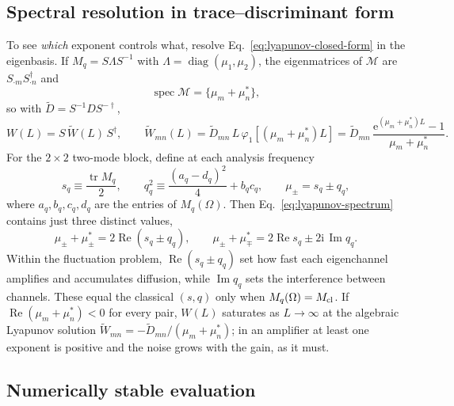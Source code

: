\documentclass[11pt,a4paper]{article}
\newcommand{\ii}{\mathrm i}
\newcommand{\e}{\mathrm e}
\newcommand{\Rea}{\operatorname{Re}}
\newcommand{\Ima}{\operatorname{Im}}
\begin{document}
\subsection{Spectral resolution in trace--discriminant form}

To see \emph{which} exponent controls what, resolve
Eq.~\eqref{eq:lyapunov-closed-form} in the eigenbasis. If
$M_q=S\Lambda S^{-1}$ with $\Lambda=\operatorname{diag}(\mu_1,\mu_2)$, the
eigenmatrices of $\mathcal M$ are $S_{\cdot m}S_{\cdot n}^\dagger$ and
\begin{equation}
\operatorname{spec}\mathcal M=\{\mu_m+\mu_n^*\},
\label{eq:lyapunov-spectrum}
\end{equation}
so with $\widetilde D=S^{-1}DS^{-\dagger}$,
\begin{equation}
W(L)=S\,\widetilde W(L)\,S^\dagger,\qquad
\widetilde W_{mn}(L)=\widetilde D_{mn}\,
L\,\varphi_1\!\left[(\mu_m+\mu_n^*)L\right]
=\widetilde D_{mn}\,\frac{\e^{(\mu_m+\mu_n^*)L}-1}{\mu_m+\mu_n^*} .
\label{eq:lyapunov-eigenbasis}
\end{equation}
For the $2\times2$ two-mode block, define at each analysis frequency
\begin{equation}
s_q\equiv\frac{\operatorname{tr}M_q}{2},\qquad
q_q^2\equiv\frac{(a_q-d_q)^2}{4}+b_qc_q,\qquad
\mu_\pm=s_q\pm q_q ,
\label{eq:Mq-eigenvalues}
\end{equation}
where $a_q,b_q,c_q,d_q$ are the entries of $M_q(\Omega)$. Then
Eq.~\eqref{eq:lyapunov-spectrum} contains just three distinct values,
\begin{equation}
\mu_\pm+\mu_\pm^*=2\Rea(s_q\pm q_q),\qquad
\mu_\pm+\mu_\mp^*=2\Rea s_q\pm2\ii\,\Ima q_q .
\label{eq:lyapunov-denominators}
\end{equation}
Within the fluctuation problem, $\Rea(s_q\pm q_q)$ set how fast each
eigenchannel amplifies and accumulates diffusion, while $\Ima q_q$ sets the
interference between channels. These equal the classical $(s,q)$ only when
$M_q(\Omega)=M_{\rm cl}$. If $\Rea(\mu_m+\mu_n^*)<0$ for every pair,
$W(L)$ saturates as $L\to\infty$ at the algebraic Lyapunov solution
$\widetilde W_{mn}=-\widetilde D_{mn}/(\mu_m+\mu_n^*)$; in an amplifier at
least one exponent is positive and the noise grows with the gain, as it must.

\subsection{Numerically stable evaluation}
\label{sec:lyapunov-robust}
\end{document}
